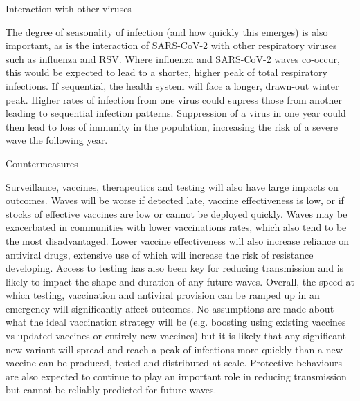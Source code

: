 \documentclass{article}
\begin{document}
Interaction with other viruses 


The degree of seasonality of infection (and how quickly this emerges) is also important, as is the interaction of SARS-CoV-2 with other respiratory viruses such as influenza and RSV. Where influenza and SARS-CoV-2 waves co-occur, this would be expected to lead to a shorter, higher peak of total respiratory infections. If sequential, the health system will face a longer, drawn-out winter peak. Higher rates of infection from one virus could supress those from another leading to sequential infection patterns. Suppression of a virus in one year could then lead to loss of immunity in the population, increasing the risk of a severe wave the following year. 


Countermeasures 


Surveillance, vaccines, therapeutics and testing will also have large impacts on outcomes. Waves will be worse if detected late, vaccine effectiveness is low, or if stocks of effective vaccines are low or cannot be deployed quickly. Waves may be exacerbated in communities with lower vaccinations rates, which also tend to be the most disadvantaged. Lower vaccine effectiveness will also increase reliance on antiviral drugs, extensive use of which will increase the risk of resistance developing. Access to testing has also been key for reducing transmission and is likely to impact the shape and duration of any future waves. Overall, the speed at which testing, vaccination and antiviral provision can be ramped up in an emergency will significantly affect outcomes. No assumptions are made about what the ideal vaccination strategy will be (e.g. boosting using existing vaccines vs updated vaccines or entirely new vaccines) but it is likely that any significant new variant will spread and reach a peak of infections more quickly than a new vaccine can be produced, tested and distributed at scale. Protective behaviours are also expected to continue to play an important role in reducing transmission but cannot be reliably predicted for future waves.
\end{document}
